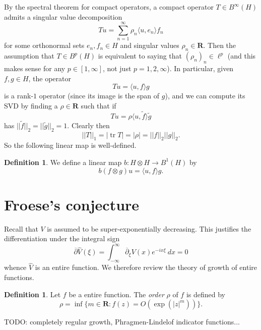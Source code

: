 \documentclass[12pt]{report}
\newcommand{\RR}{\mathbf{R}}
\newcommand{\dbar}{\overline \partial}
\newcommand{\dfn}[1]{\emph{#1}\index{#1}}
\newcommand{\tr}{\operatorname{tr}}
\theoremstyle{definition}
\newtheorem{definition}[theorem]{Definition}
\begin{document}
By the spectral theorem for compact operators, a compact operator $T \in B^\infty(H)$ admits a singular value decomposition
$$Tu = \sum_{n=1}^\infty \rho_n \langle u, e_n\rangle f_n$$
for some orthonormal sets $e_n,f_n \in H$ and singular values $\rho_n \in \RR$. Then the assumption that $T \in B^p(H)$ is equivalent to saying that $(\rho_n)_n \in \ell^p$ (and this makes sense for any $p \in [1, \infty]$, not just $p =1,2,\infty$). In particular, given $f, g \in H$, the operator
$$Tu = \langle u, f \rangle g$$
is a rank-$1$ operator (since its image is the span of $g$), and we can compute its SVD by finding a $\rho \in \RR$ such that if
$$Tu = \rho \langle u, \tilde f \rangle \tilde g$$
has $||\tilde f||_2 = ||\tilde g||_2 = 1$. Clearly then
\begin{equation}\label{b1 norm of a tensor product}||T||_1 = |\tr T| = |\rho| = ||f||_2 ||g||_2.\end{equation}
So the following linear map is well-defined.
\begin{definition}
\label{tensor products are trace class}
We define a linear map $b: H \otimes H \to B^1(H)$ by
$$b(f \otimes g)u = \langle u, f \rangle g.$$
\end{definition}

\section{Froese's conjecture}
Recall that $V$ is assumed to be super-exponentially decreasing. This justifies the differentiation under the integral sign
$$\dbar \hat V(\xi) = \int_{-\infty}^\infty \dbar_\xi V(x) e^{-ix\xi} ~dx = 0$$
whence $\hat V$ is an entire function. We therefore review the theory of growth of entire functions.

\begin{definition}
Let $f$ be a entire function. The \dfn{order} $\rho$ of $f$ is defined by
$$\rho = \inf \{m \in \RR: f(z) = O(\exp(|z|^m))\}.$$
\end{definition}


TODO: completely regular growth, Phragmen-Lindelof indicator functions...
\end{document}

